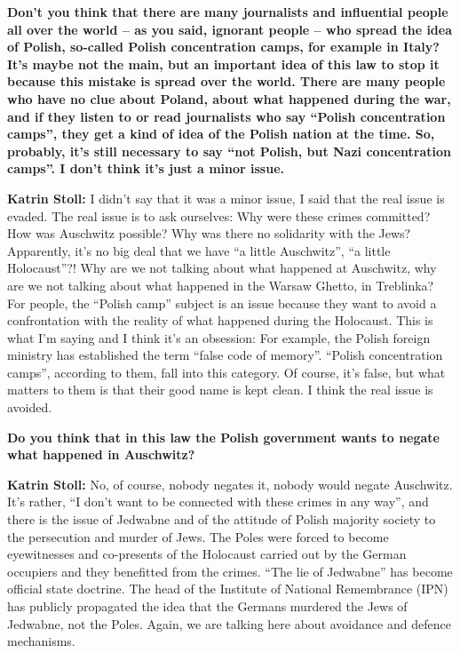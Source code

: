 \textbf{Don’t you think that there are many journalists and influential people all over the world – as you said, ignorant people – who spread the idea of Polish, so-called Polish concentration camps, for example in Italy? It’s maybe not the main, but an important idea of this law to stop it because this mistake is spread over the world. There are many people who have no clue about Poland, about what happened during the war, and if they listen to or read journalists who say ``Polish concentration camps'', they get a kind of idea of the Polish nation at the time. So, probably, it’s still necessary to say ``not Polish, but Nazi concentration camps''.  I don’t think it’s just a minor issue.} 

\textbf{Katrin Stoll:} I didn’t say that it was a minor issue, I said that the real issue is evaded. The real issue is to ask ourselves: Why were these crimes committed? How was Auschwitz possible? Why was there no solidarity with the Jews? Apparently, it’s no big deal that we have ``a little Auschwitz'', ``a little Holocaust''?! Why are we not talking about what happened at Auschwitz, why are we not talking about what happened in the Warsaw Ghetto, in Treblinka? For people, the ``Polish camp'' subject is an issue because they want to avoid a confrontation with the reality of what happened during the Holocaust. This is what I’m saying and I think it’s an obsession: For example, the Polish foreign ministry has established the term ``false code of memory''. ``Polish concentration camps'', according to them, fall into this category. Of course, it’s false, but what matters to them is that their good name is kept clean. I think the real issue is avoided.

\textbf{Do you think that in this law the Polish government wants to negate what happened in Auschwitz?} 

\textbf{Katrin Stoll:} No, of course, nobody negates it, nobody would negate Auschwitz. It’s rather, ``I don’t want to be connected with these crimes in any way'', and there is the issue of Jedwabne and of the attitude of Polish majority society to the persecution and murder of Jews. The Poles were forced to become eyewitnesses and co-presents of the Holocaust carried out by the German occupiers and they benefitted from the crimes. ``The lie of Jedwabne'' has become official state doctrine. The head of the Institute of National Remembrance (IPN) has publicly propagated the idea that the Germans murdered the Jews of Jedwabne, not the Poles. Again, we are talking here about avoidance and defence mechanisms. 

